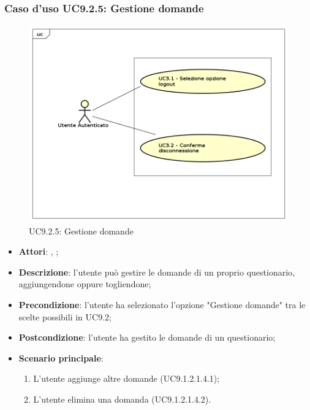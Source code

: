 		\subsubsection{Caso d'uso UC9.2.5: Gestione domande}
		\label{UC9.2.5}
		\begin{figure}[h]
			\centering
			\includegraphics[scale=0.5,keepaspectratio]{UML/UC9.png}
			\caption{UC9.2.5: Gestione domande}
		\end{figure}
		\FloatBarrier
		\begin{itemize}
			\item \textbf{Attori}: \uau, \uaupro;
			\item \textbf{Descrizione}: l'utente può gestire le domande di un proprio questionario, aggiungendone oppure togliendone;
			\item \textbf{Precondizione}: l'utente ha selezionato l'opzione "Gestione domande" tra le scelte possibili in UC9.2;
			\item \textbf{Postcondizione}: l'utente ha gestito le domande di un questionario;
			\item \textbf{Scenario principale}: 
			\begin{enumerate}
				\item L'utente aggiunge altre domande (UC9.1.2.1.4.1);
				\item L'utente elimina una domanda (UC9.1.2.1.4.2).
			\end{enumerate}
		\end{itemize}
		
